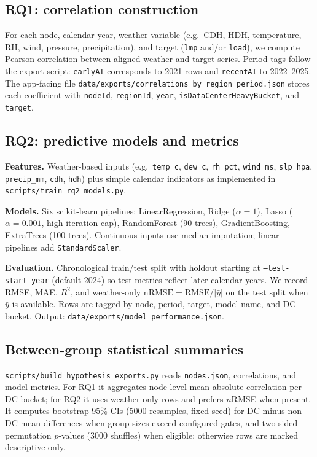 \documentclass[11pt]{article}
\begin{document}
\subsection*{RQ1: correlation construction}
For each node, calendar year, weather variable (e.g.\ CDH, HDH, temperature, RH, wind, pressure, precipitation), and target (\texttt{lmp} and/or \texttt{load}), we compute Pearson correlation between aligned weather and target series. Period tags follow the export script: \texttt{earlyAI} corresponds to \num{2021} rows and \texttt{recentAI} to \num{2022}--\num{2025}. The app-facing file \texttt{data/exports/correlations\_by\_region\_period.json} stores each coefficient with \texttt{nodeId}, \texttt{regionId}, \texttt{year}, \texttt{isDataCenterHeavyBucket}, and \texttt{target}.

\subsection*{RQ2: predictive models and metrics}
\textbf{Features.} Weather-based inputs (e.g.\ \texttt{temp\_c}, \texttt{dew\_c}, \texttt{rh\_pct}, \texttt{wind\_ms}, \texttt{slp\_hpa}, \texttt{precip\_mm}, \texttt{cdh}, \texttt{hdh}) plus simple calendar indicators as implemented in \texttt{scripts/train\_rq2\_models.py}.

\textbf{Models.} Six scikit-learn pipelines: LinearRegression, Ridge ($\alpha{=}1$), Lasso ($\alpha{=}0.001$, high iteration cap), RandomForest (\num{90} trees), GradientBoosting, ExtraTrees (\num{100} trees). Continuous inputs use median imputation; linear pipelines add \texttt{StandardScaler}.

\textbf{Evaluation.} Chronological train/test split with holdout starting at \texttt{--test-start-year} (default \num{2024}) so test metrics reflect later calendar years. We record RMSE, MAE, $R^2$, and weather-only $\mathrm{nRMSE}=\mathrm{RMSE}/|\bar{y}|$ on the test split when $\bar{y}$ is available. Rows are tagged by node, period, target, model name, and DC bucket. Output: \texttt{data/exports/model\_performance.json}.

\subsection*{Between-group statistical summaries}
\texttt{scripts/build\_hypothesis\_exports.py} reads \texttt{nodes.json}, correlations, and model metrics. For RQ1 it aggregates node-level mean absolute correlation per DC bucket; for RQ2 it uses weather-only rows and prefers $n$RMSE when present. It computes bootstrap \num{95}\% CIs (\num{5000} resamples, fixed seed) for DC minus non-DC mean differences when group sizes exceed configured gates, and two-sided permutation $p$-values (\num{3000} shuffles) when eligible; otherwise rows are marked descriptive-only.
\end{document}
